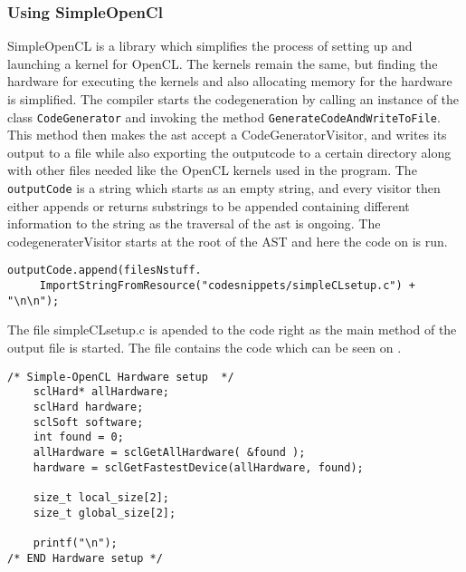 \subsubsection*{Using SimpleOpenCl}
SimpleOpenCL is a library which simplifies the process of setting up and launching a kernel for OpenCL.
The kernels remain the same, but finding the hardware for executing the kernels and also allocating memory for the hardware is simplified.
The compiler starts the codegeneration by calling an instance of the class \texttt{CodeGenerator} and invoking the method \texttt{GenerateCodeAndWriteToFile}.
This method then makes the \acrshort{ast} accept a CodeGeneratorVisitor, and writes its output to a file while also exporting the outputcode to a certain directory along with other files needed like the OpenCL kernels used in the program.
The \texttt{outputCode} is a string which starts as an empty string, and every visitor then either appends or returns substrings to be appended containing different information to the string as the traversal of the \acrshort{ast} is ongoing.
The codegeneraterVisitor starts at the root of the AST and here the code on  is run.

\begin{lstlisting}[caption=Call to setup SimpleOpenCL in the compiler,numbers=none,frame=tlrb,label={lst:OpenCLSetup}]
outputCode.append(filesNstuff.
	 ImportStringFromResource("codesnippets/simpleCLsetup.c") + "\n\n");
\end{lstlisting}

The file simpleCLsetup.c is apended to the code right as the main method of the output file is started.
The file contains the code which can be seen on .

\begin{lstlisting}[caption=SimpleOpenCL setup in the compiler,numbers=none,frame=tlrb,label={lst:OpenCLSetup2}]
/* Simple-OpenCL Hardware setup  */
	sclHard* allHardware;
	sclHard hardware;
	sclSoft software;
	int found = 0;
	allHardware = sclGetAllHardware( &found );
	hardware = sclGetFastestDevice(allHardware, found);

    size_t local_size[2];
    size_t global_size[2];

    printf("\n");
/* END Hardware setup */
\end{lstlisting}

